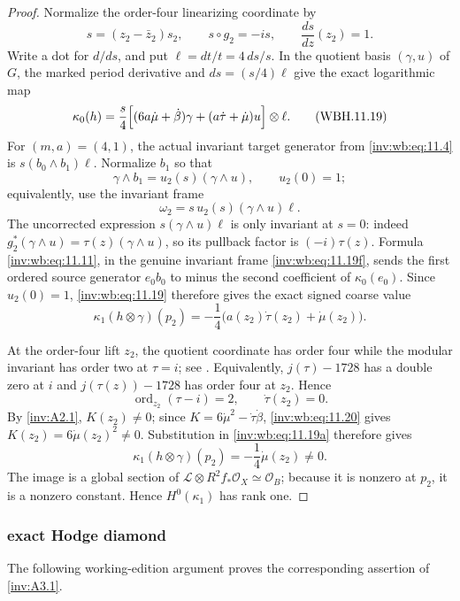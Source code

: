 \begin{proof}
Normalize the order-four linearizing coordinate by
\[
 s=(z_2-\bar z_2)s_2,
 \qquad s\circ g_2=-is,
 \qquad \frac{ds}{dz}(z_2)=1.
\]
Write a dot for $d/ds$, and put
$\ell=dt/t=4\,ds/s$.  In the quotient basis $(\gamma,u)$ of $G$, the
marked period derivative and $ds=(s/4)\ell$ give the exact logarithmic map
\[
 \kappa_0(h)=\frac{s}{4}
 \Bigl[(6a\dot\mu+\dot\beta)\gamma
 +(a\dot\tau+\dot\mu)u\Bigr]\otimes\ell.
\tag{WBH.11.19}\label{inv:wb:eq:11.19}
\]
For $(m,a)=(4,1)$, the actual invariant target generator from \eqref{inv:wb:eq:11.4} is
$s(b_0\wedge b_1)\ell$.  Normalize $b_1$ so that
\[
 \gamma\wedge b_1=u_2(s)(\gamma\wedge u),
 \qquad u_2(0)=1;
\]
equivalently, use the invariant frame
\[
 \omega_2=s\,u_2(s)(\gamma\wedge u)\ell.
\tag{WBH.11.19f}\label{inv:wb:eq:11.19f}
\]
The uncorrected expression $s(\gamma\wedge u)\ell$ is only invariant at
$s=0$: indeed $g_2^*(\gamma\wedge u)=\tau(z)(\gamma\wedge u)$, so its
pullback factor is $(-i)\tau(z)$.  Formula \eqref{inv:wb:eq:11.11}, in the genuine invariant
frame \eqref{inv:wb:eq:11.19f}, sends the first ordered source generator $e_0b_0$ to
minus the second coefficient of $\kappa_0(e_0)$.  Since $u_2(0)=1$,
\eqref{inv:wb:eq:11.19} therefore gives the exact signed coarse value
\[
 \kappa_1(h\otimes\gamma)(p_2)
 =-\frac14\bigl(a(z_2)\dot\tau(z_2)+\dot\mu(z_2)\bigr).
\tag{WBH.11.19a}\label{inv:wb:eq:11.19a}
\]

At the order-four lift $z_2$, the quotient coordinate has order four while
the modular invariant has order two at $\tau=i$; see
\cite[Chapter~VII]{Serre1973}.  Equivalently,
$j(\tau)-1728$ has a double zero at $i$ and
$j(\tau(z))-1728$ has order four at $z_2$.  Hence
\[
 \operatorname{ord}_{z_2}(\tau-i)=2,\qquad \dot\tau(z_2)=0.
\tag{WBH.11.20}\label{inv:wb:eq:11.20}
\]
By \cref{inv:A2.1}, $K(z_2)\ne0$; since
$K=6\dot\mu^2-\dot\tau\dot\beta$, \eqref{inv:wb:eq:11.20} gives
$K(z_2)=6\dot\mu(z_2)^2\ne0$.  Substitution in \eqref{inv:wb:eq:11.19a} therefore gives
\[
 \kappa_1(h\otimes\gamma)(p_2)=-\frac14\dot\mu(z_2)\ne0.
\tag{WBH.11.20a}\label{inv:wb:eq:11.20a}
\]
The image is a global section of
$\mathcal L\otimes R^2f_*\mathcal O_X\simeq\mathcal O_B$; because it is
nonzero at $p_2$, it is a nonzero constant.  Hence
$H^0(\kappa_1)$ has rank one.
\end{proof}

\subsubsection{exact Hodge diamond}\label{inv:wbproof:cor:exact-hodge-diamond}
The following working-edition argument proves the corresponding assertion of \cref{inv:A3.1}.


